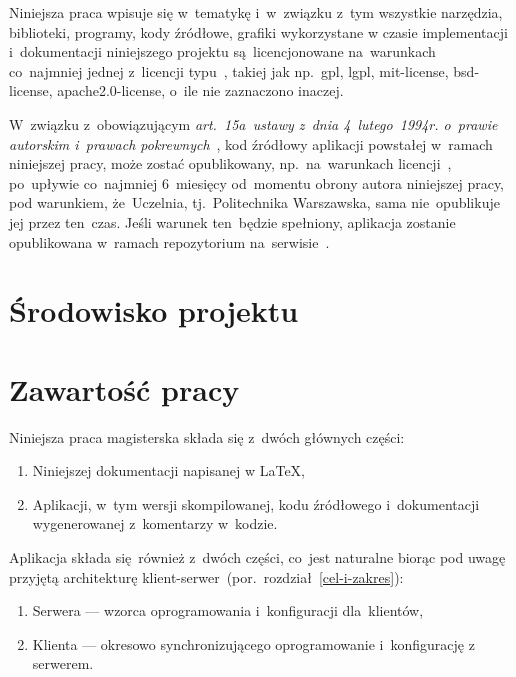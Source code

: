 \documentclass[thesis]{subfiles}
\begin{document}
Niniejsza praca wpisuje się w~tematykę  i~w~związku z~tym wszystkie narzędzia, biblioteki, programy, kody źródłowe, grafiki wykorzystane w czasie implementacji i~dokumentacji niniejszego projektu są~licencjonowane na~warunkach co~najmniej jednej z~licencji typu~, takiej jak np.~\gls{gpl}, \gls{lgpl}, \gls{mit-license}, \gls{bsd-license}, \gls{apache2.0-license}, o~ile nie zaznaczono inaczej.

W~związku z~obowiązującym \emph{art.~15a~ustawy z~dnia 4~lutego~1994r. o~prawie autorskim i~prawach pokrewnych}~\cite{papp}, kod źródłowy aplikacji powstałej w~ramach niniejszej pracy, może zostać opublikowany, np.~na~warunkach licencji~, po~upływie co~najmniej 6~miesięcy od~momentu obrony autora niniejszej pracy, pod warunkiem, że~Uczelnia, tj.~Politechnika Warszawska, sama nie~opublikuje jej przez ten~czas. Jeśli warunek ten~będzie spełniony, aplikacja zostanie opublikowana w~ramach repozytorium na~serwisie~.

\newpage

\section{Środowisko projektu}

\section{Zawartość pracy}

\noindent Niniejsza praca magisterska składa się z~dwóch głównych części:
\begin{enumerate}
	\item Niniejszej dokumentacji napisanej w \LaTeX,
	\item Aplikacji, w~tym wersji skompilowanej, kodu źródłowego i~dokumentacji wygenerowanej z~komentarzy w~kodzie.
\end{enumerate}
Aplikacja składa się~również z~dwóch części, co~jest naturalne biorąc pod uwagę przyjętą architekturę klient-serwer~(por.~rozdział~\ref{cel-i-zakres}):
\begin{enumerate}
	\item Serwera --- wzorca oprogramowania i~konfiguracji dla~klientów,
	\item Klienta --- okresowo synchronizującego oprogramowanie i~konfigurację z serwerem.
\end{enumerate}
\end{document}
